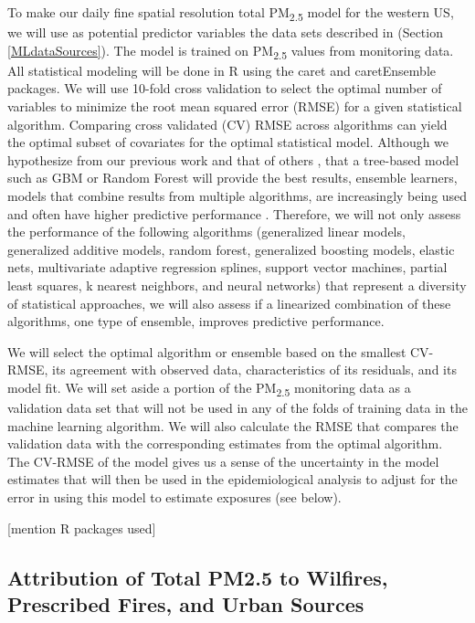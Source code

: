 \documentclass[authoryear]{elsarticle}
\begin{document}
To make our daily fine spatial resolution total PM\textsubscript{2.5} model for the western US, we will use as potential predictor variables the data sets described in  (Section \ref{MLdataSources}). 
The model is trained on PM\textsubscript{2.5} values from monitoring data. 
All statistical modeling will be done in R \citep{Rproject2017} using the caret \citep{Rcaret2017} and caretEnsemble \citep{RcaretEnsemble2017} packages. We will use 10-fold cross validation to select the optimal number of variables to minimize the root mean squared error (RMSE) for a given statistical algorithm. Comparing cross validated (CV) RMSE across algorithms can yield the optimal subset of covariates for the optimal statistical model. Although we hypothesize from our previous work and that of others \citep{Reid2015,BrokampExposure2017,PandeyPredicting2013}, that a tree-based model such as GBM or Random Forest will provide the best results, ensemble learners, models that combine results from multiple algorithms, are increasingly being used and often have higher predictive performance \citep{DaviesOptimal2016}. Therefore, we will not only assess the performance of the following algorithms (generalized linear models, generalized additive models, random forest, generalized boosting models, elastic nets, multivariate adaptive regression splines, support vector machines, partial least squares, k nearest neighbors, and neural networks) that represent a diversity of statistical approaches, we will also assess if a linearized combination of these algorithms, one type of ensemble, improves predictive performance.

We will select the optimal algorithm or ensemble based on the smallest CV-RMSE, its agreement with observed data, characteristics of its residuals, and its model fit. 
We will set aside a portion of the PM\textsubscript{2.5} monitoring data as a validation data set that will not be used in any of the folds of training data in the machine learning algorithm. We will also calculate the RMSE that compares the validation data with the corresponding estimates from the optimal algorithm. The CV-RMSE of the model gives us a sense of the uncertainty in the model estimates that will then be used in the epidemiological analysis to adjust for the error in using this model to estimate exposures (see below).
	
	[mention R packages used]
	
	\subsection{Attribution of Total PM2.5 to Wilfires, Prescribed Fires, and Urban Sources} %
	
\end{document}
